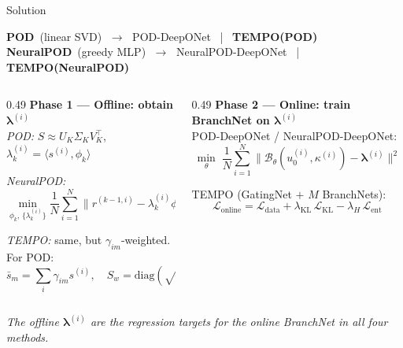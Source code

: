 \documentclass[aspectratio=169]{beamer}
\begin{document}
\begin{frame}{Solution}

\begin{center}\small
  \textbf{POD}~(linear SVD)
    $\;\to\;$ POD-DeepONet ~|~ \textcolor{red!70}{\textbf{TEMPO(POD)}}\\[3pt]
  \textbf{NeuralPOD}~(greedy MLP)
    $\;\to\;$ NeuralPOD-DeepONet ~|~ \textcolor{red!70}{\textbf{TEMPO(NeuralPOD)}}
\end{center}

\smallskip

\begin{columns}[T]
\begin{column}{0.49\textwidth}
  \small\textbf{Phase 1 — Offline: obtain $\boldsymbol{\lambda}^{(i)}$}\\[4pt]

  \textit{POD:}\enspace
  $S \approx U_K\Sigma_K V_K^\top$,\quad
  $\lambda_k^{(i)} = \langle s^{(i)}, \phi_k\rangle$

  \smallskip
  \textit{NeuralPOD:}
  \[
    \min_{\phi_k,\,\{\lambda_k^{(i)}\}}
    \frac{1}{N}\sum_{i=1}^N
    \bigl\|r^{(k-1,i)} - \lambda_k^{(i)}\phi_k\bigr\|^2
  \]

  \textit{TEMPO:} same, but $\gamma_{im}$-weighted. For POD:
  \[
    \bar{s}_m = \textstyle\sum_i \gamma_{im} s^{(i)},\quad
    S_w = \mathrm{diag}(\sqrt{\gamma_{\cdot m}})\,\tilde{S}
  \]
\end{column}
\begin{column}{0.49\textwidth}
  \small\textbf{Phase 2 — Online: train BranchNet on $\boldsymbol{\lambda}^{(i)}$}\\[4pt]

  POD-DeepONet / NeuralPOD-DeepONet:
  \[
    \min_\theta\;\frac{1}{N}\sum_{i=1}^N
    \bigl\|\mathcal{B}_\theta(u_0^{(i)},\kappa^{(i)}) - \boldsymbol{\lambda}^{(i)}\bigr\|^2
  \]

  TEMPO (GatingNet $+$ $M$ BranchNets):
  \[
    \mathcal{L}_{\text{online}}
    = \mathcal{L}_{\text{data}}
    + \lambda_{\text{KL}}\,\mathcal{L}_{\text{KL}}
    - \lambda_H\,\mathcal{L}_{\text{ent}}
  \]
\end{column}
\end{columns}

\vspace{0.15cm}
{\footnotesize\itshape
  The offline $\boldsymbol{\lambda}^{(i)}$ are the regression targets for the online
  BranchNet in all four methods.}

\end{frame}
\end{document}
